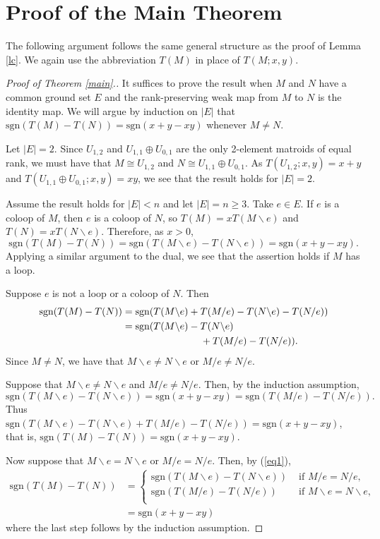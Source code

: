 \documentclass[12pt,reqno]{amsart}
\theoremstyle{definition}
\theoremstyle{remark}
\numberwithin{equation}{section}
\newcommand{\del}{\backslash}
\begin{document}
\section{Proof of the Main Theorem}
The following argument follows the same general structure as the proof of Lemma \ref{lc}. We again use the abbreviation $T(M)$ in place of $T(M;x,y)$.
\begin{proof}[Proof of Theorem \ref{main}.]
    It suffices to prove the result when $M$ and $N$ have a common ground set $E$ and the rank-preserving weak map from $M$ to $N$ is the identity map. 
    We will argue by induction on $|E|$ that $\text{sgn}(T(M)-T(N))=\text{sgn}(x+y-xy)$ whenever $M\neq N$. 
    
    Let $|E|=2$. 
    Since $U_{1,2}$ and $U_{1,1}\oplus U_{0,1}$ are the only 2-element matroids of equal rank, we must have that $M\cong U_{1,2}$ and $N\cong U_{1,1}\oplus U_{0,1}$. 
    As \mbox{$T(U_{1,2};x,y)=x+y$} and $T(U_{1,1}\oplus U_{0,1};x,y)=xy$, we see that the result holds for $|E|=2$. 


    Assume the result holds for $|E|<n$ and let $|E|=n\geq 3$. Take $e\in E$.
    If $e$ is a coloop of $M$, then $e$ is a coloop of $N$, so $T(M)=xT(M\del e)$ and $T(N)=xT(N\del e)$. 
    Therefore, as $x>0$, 
    \[\text{sgn}(T(M)-T(N))=\text{sgn}(T(M\del e)-T(N\del e))=\text{sgn}(x+y-xy).\] 
    Applying a similar argument to the dual, we see that the assertion holds if $M$ has a loop. 

    Suppose $e$ is not a loop or a coloop of $N$.
    Then  
        \begin{align}\label{eq1}
            \text{sgn}(T(M)-T(N))&=\text{sgn}(T(M\del e)+T(M/e)-T(N\del e)-T(N/e))\nonumber\\
                                 &=\text{sgn}(T(M\del e)-T(N\del e)\nonumber\\
                                 &\hspace{2.8cm}+T(M/ e)-T(N/e)). 
        \end{align}
    Since $M\neq N$, we have that $M\del e\neq N\del e$ or $M/e\neq N/e$. 

    Suppose that $M\del e\neq N\del e$ and $M/e\neq N/e$. Then, by the induction assumption,  
    \[
        \text{sgn}(T(M\del e)-T(N\del e))=\text{sgn}(x+y-xy)=\text{sgn}(T(M/e)-T(N/e)).
    \]
    Thus $\text{sgn}(T(M\del e)-T(N\del e)+T(M/e)-T(N/e))=\text{sgn}(x+y-xy)$, that is, $\text{sgn}(T(M)-T(N))=\text{sgn}(x+y-xy)$.  

Now suppose that $M\del e=N\del e$ or $M/e=N/e$. Then, by (\ref{eq1}),  
    \begin{align*}
        \text{sgn}(T(M)-T(N))&=\begin{cases}
                                     \text{sgn}(T(M\del e)-T(N\del e)) &\text{ if } M/e=N/e,\\
                                     \text{sgn}(T(M/e)-T(N/e)) &\text{ if } M\del e=N\del e,\\
                                 \end{cases}\\
                             &= \text{sgn}(x+y-xy)
    \end{align*}
    where the last step follows by the induction assumption. 


\end{proof}
\end{document}
